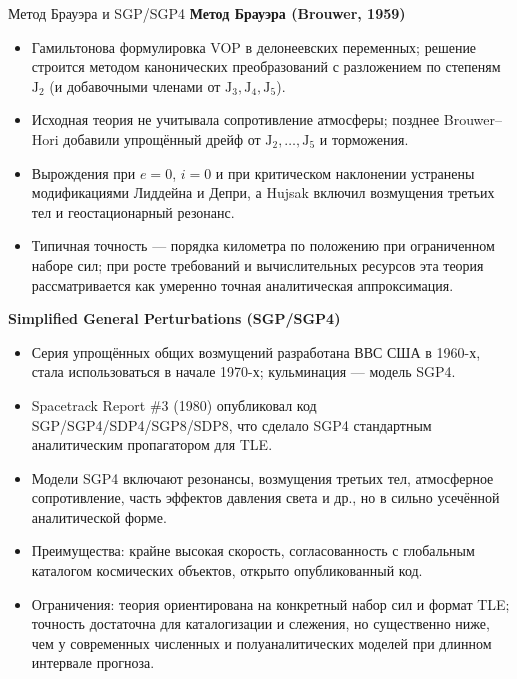 \documentclass[8pt]{beamer}
\begin{document}
\begin{frame}{Метод Брауэра и SGP/SGP4}
\textbf{Метод Брауэра (Brouwer, 1959)}

\begin{itemize}
\justifying
  \item Гамильтонова формулировка VOP в делонеевских переменных; решение строится
        методом канонических преобразований с разложением по степеням $\text{J}_2$ (и
        добавочными членами от $\text{J}_3, \text{J}_4, \text{J}_5$). 
  \item Исходная теория не учитывала сопротивление атмосферы; позднее Brouwer–Hori
        добавили упрощённый дрейф от $\text{J}_2, \dots , \text{J}_5$ и торможения.
  \item Вырождения при $e=0$, $i=0$ и при критическом наклонении устранены
        модификациями Лиддейна и Депри, а Hujsak включил возмущения третьих тел и
        геостационарный резонанс.
  \item Типичная точность — порядка километра по положению при ограниченном
        наборе сил; при росте требований и вычислительных ресурсов эта теория
        рассматривается как умеренно точная аналитическая аппроксимация. 
\end{itemize}

\vspace{0.4em}
\textbf{Simplified General Perturbations (SGP/SGP4)}

\begin{itemize}
\justifying
  \item Серия упрощённых общих возмущений разработана ВВС США в 1960-х,
        стала использоваться в начале 1970-х; кульминация — модель SGP4. 
  \item Spacetrack Report \#3 (1980) опубликовал код SGP/SGP4/SDP4/SGP8/SDP8,
        что сделало SGP4 стандартным аналитическим пропагатором для TLE. 
  \item Модели SGP4 включают резонансы, возмущения третьих тел, атмосферное
        сопротивление, часть эффектов давления света и др., но в сильно
        усечённой аналитической форме.
  \item Преимущества: крайне высокая скорость, согласованность с глобальным
        каталогом космических объектов, открыто опубликованный код.
  \item Ограничения: теория ориентирована на конкретный набор сил и формат TLE;
        точность достаточна для каталогизации и слежения, но существенно ниже,
        чем у современных численных и полуаналитических моделей при длинном
        интервале прогноза. 
\end{itemize}

\end{frame}
\end{document}
